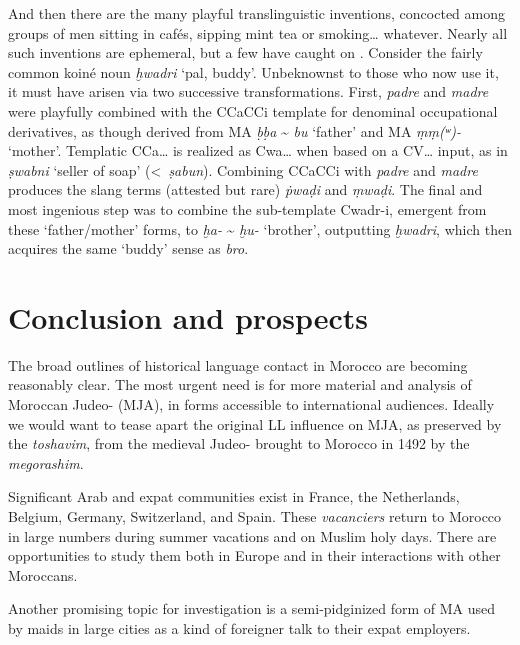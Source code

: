 \documentclass[output=paper]{langsci/langscibook}
\begin{document}
And then there are the many playful translinguistic inventions, concocted among groups of men sitting in cafés, sipping mint tea or smoking… whatever. Nearly all such inventions are ephemeral, but a few have caught on \citep{Heath1987}. Consider the fairly common koiné noun \textit{ḫwadri} ‘pal, buddy’. Unbeknownst to those who now use it, it must have arisen via two successive transformations. First,  \textit{padre} and \textit{madre} were playfully combined with the CCaCCi template for denominal occupational derivatives, as though derived from MA \textit{ḅḅa} {\textasciitilde} \textit{bu} ‘father’ and MA \textit{ṃṃ(ʷ)-} ‘mother’. Templatic CCa… is realized as Cwa… when based on a CV… input, as in \textit{ṣwabni} ‘seller of soap’ (<~\textit{ṣabun}). Combining CCaCCi with \textit{padre} and \textit{madre} produces the slang terms (attested but rare) \textit{ṗwaḍ{\R}i} and \textit{ṃwaḍ{\R}i}. The final and most ingenious step was to combine the sub-template Cwadr-i, emergent from these ‘father/mother’ forms, to \textit{ḫa-} {\textasciitilde} \textit{ḫu-} ‘brother’, outputting \textit{ḫwadri}, which then acquires the same ‘buddy’ sense as   \textit{bro}. 

\section{Conclusion and prospects}

The broad outlines of historical language contact in Morocco are becoming reasonably clear. The most urgent need is for more material and analysis of Mor\-occan Judeo- (MJA), in forms accessible to international audiences. Ideally we would want to tease apart the original LL influence on  MJA, as preserved by the \textit{toshavim}, from the medieval Judeo- brought to Morocco in 1492 by the \textit{megorashim}. 

Significant  Arab and  expat communities exist in France, the Netherlands, Belgium, Germany, Switzerland, and Spain. These \textit{vacanciers} return to Morocco in large numbers during summer vacations and on Muslim holy days. There are opportunities to study them both in Europe \citep{Nortier1990} and in their interactions with other Moroccans. 

Another promising topic for investigation is a semi-pidginized form of MA used by  maids in large cities as a kind of foreigner talk to their expat  employers.
\end{document}
